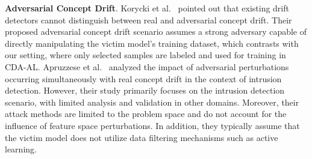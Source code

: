 \textbf{Adversarial Concept Drift}.
Korycki et al.~\cite{2023-CCF-B-Adversarial-concept-drift-detection-under-poisoning-attacks} pointed out that existing drift detectors cannot distinguish between real and adversarial concept drift. 
Their proposed adversarial concept drift scenario assumes a strong adversary capable of directly manipulating the victim model’s training dataset, which contrasts with our setting, where only selected samples are labeled and used for training in CDA-AL.
Apruzzese et al.~\cite{apruzzese2024adversarial} analyzed the impact of adversarial perturbations occurring simultaneously with real concept drift in the context of intrusion detection.
However, their study primarily focuses on the intrusion detection scenario, with limited analysis and validation in other domains.
Moreover, their attack methods are limited to the problem space and do not account for the influence of feature space perturbations.
In addition, they typically assume that the victim model does not utilize data filtering mechanisms such as active learning.

%



